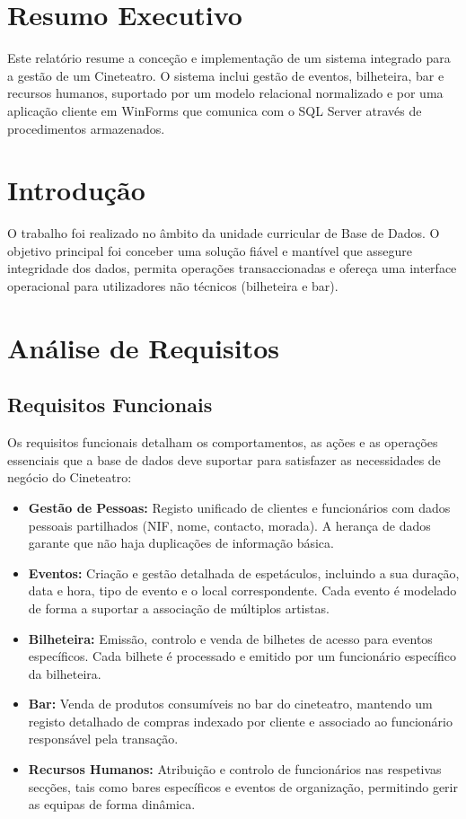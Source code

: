 \documentclass[11pt,a4paper]{article}
\begin{document}
\section{Resumo Executivo}
Este relatório resume a conceção e implementação de um sistema integrado para a gestão de um Cineteatro. O sistema inclui gestão de eventos, bilheteira, bar e recursos humanos, suportado por um modelo relacional normalizado e por uma aplicação cliente em WinForms que comunica com o SQL Server através de procedimentos armazenados.

\section{Introdução}
O trabalho foi realizado no âmbito da unidade curricular de Base de Dados. O objetivo principal foi conceber uma solução fiável e mantível que assegure integridade dos dados, permita operações transaccionadas e ofereça uma interface operacional para utilizadores não técnicos (bilheteira e bar).

\section{Análise de Requisitos}

\subsection{Requisitos Funcionais}
Os requisitos funcionais detalham os comportamentos, as ações e as operações essenciais que a base de dados deve suportar para satisfazer as necessidades de negócio do Cineteatro:
\begin{itemize}
    \item \textbf{Gestão de Pessoas:} Registo unificado de clientes e funcionários com dados pessoais partilhados (NIF, nome, contacto, morada). A herança de dados garante que não haja duplicações de informação básica.
    \item \textbf{Eventos:} Criação e gestão detalhada de espetáculos, incluindo a sua duração, data e hora, tipo de evento e o local correspondente. Cada evento é modelado de forma a suportar a associação de múltiplos artistas.
    \item \textbf{Bilheteira:} Emissão, controlo e venda de bilhetes de acesso para eventos específicos. Cada bilhete é processado e emitido por um funcionário específico da bilheteira.
    \item \textbf{Bar:} Venda de produtos consumíveis no bar do cineteatro, mantendo um registo detalhado de compras indexado por cliente e associado ao funcionário responsável pela transação.
    \item \textbf{Recursos Humanos:} Atribuição e controlo de funcionários nas respetivas secções, tais como bares específicos e eventos de organização, permitindo gerir as equipas de forma dinâmica.
\end{itemize}
\end{document}
